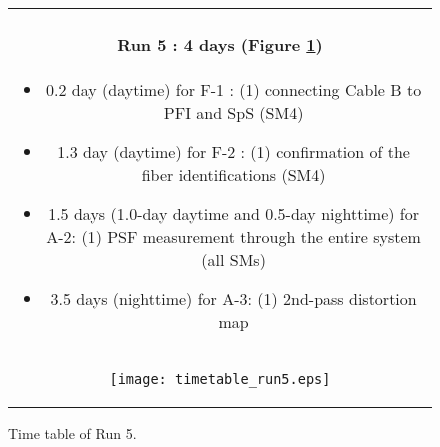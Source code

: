 \begin{figure}[!ht]
\begin{center}
\begin{tabular}{c}
\begin{minipage}{0.95\hsize}
\paragraph{Run 5 : 4 days  (Figure \ref{fig:run5})}
	\begin{itemize}
	\item 0.2 day (daytime) for F-1 :  
	(1) connecting Cable B to PFI and SpS (SM4)
	\item 1.3 day (daytime) for F-2 :  
	(1) confirmation of  the fiber identifications (SM4)
	\item 1.5 days (1.0-day daytime and 0.5-day nighttime) for A-2: 
	(1) PSF measurement through the entire system (all SMs)
	\item 3.5 days (nighttime) for A-3: 
	(1) 2nd-pass distortion map
	\end{itemize}
\end{minipage} \\
\begin{minipage}{0.8\hsize}
	\begin{center}
	\vspace*{5mm}
	\texttt{[image: timetable\_run5.eps]}
	\end{center}
	\vspace*{-5mm}
	\caption{Time table of Run 5.}
	\label{fig:run5}
\end{minipage}
\end{tabular}
\end{center}
\end{figure}

